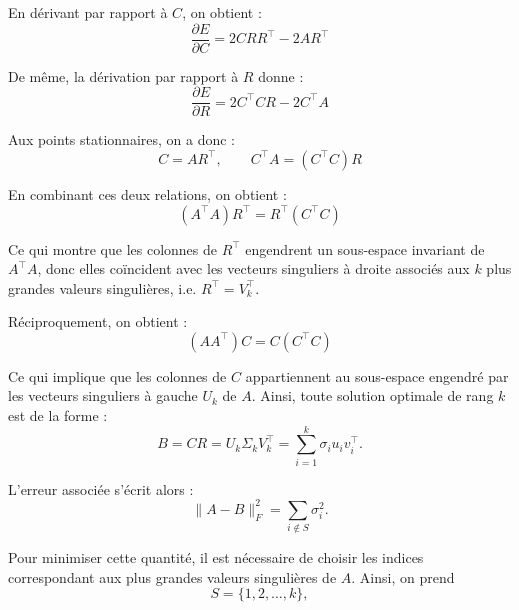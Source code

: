 \documentclass[12pt]{report}
\begin{document}
\noindent En dérivant par rapport à $C$, on obtient :
\begin{equation*}
    \frac{\partial E}{\partial C} = 2C R R^{\top} - 2A R^{\top}
\end{equation*}

\noindent De même, la dérivation par rapport à $R$ donne :
\begin{equation*}
    \frac{\partial E}{\partial R} = 2C^{\top}C R - 2C^{\top}A
\end{equation*}

\noindent Aux points stationnaires, on a donc :
\begin{equation*}
    C = A R^{\top}, \qquad C^{\top}A = (C^{\top}C)R
\end{equation*}

\noindent En combinant ces deux relations, on obtient :
\begin{equation*}
    (A^{\top}A)R^{\top} = R^{\top}(C^{\top}C)
\end{equation*}

\noindent Ce qui montre que les colonnes de $R^{\top}$ engendrent un sous-espace invariant de $A^{\top}A$, donc elles coïncident avec les vecteurs singuliers à droite associés aux $k$ plus grandes valeurs singulières, i.e. $R^{\top} = V_k^{\top}$.

\noindent Réciproquement, on obtient :
\begin{equation*}
    (AA^{\top})C = C(C^{\top}C)
\end{equation*}

\noindent Ce qui implique que les colonnes de $C$ appartiennent au sous-espace engendré par les vecteurs singuliers à gauche $U_k$ de $A$.
\clearpage
\noindent Ainsi, toute solution optimale de rang $k$ est de la forme :
\begin{equation}
    B = CR = U_k \Sigma_k V_k^{\top} = \sum_{i=1}^{k} \sigma_i u_i v_i^{\top}.
\end{equation}

\noindent L'erreur associée s'écrit alors :
\begin{equation}
    \|A - B\|_F^2 = \sum_{i \notin S} \sigma_i^2.
\end{equation}

\noindent Pour minimiser cette quantité, il est nécessaire de choisir les indices correspondant aux plus grandes valeurs singulières de $A$. Ainsi, on prend
\begin{equation}
    S = \{1, 2, \dots, k\},
\end{equation}
\end{document}
